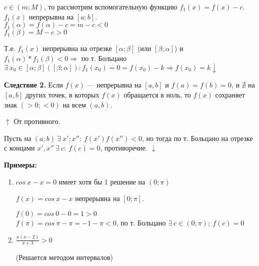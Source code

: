 \documentclass{article}
\begin{document}
    \( c \in (m; M) \), то рассмотрим вспомогательную функцию \( f_1(x) = f(x) - c \). \( f_1(x) \) непрерывна на \( [a; b] \).\\
    \( f_1(\alpha) = f(\alpha) - c = m - c < 0 \)\\
    \( f_1(\beta) = M - c > 0 \)

    Т.е. \(f_1(x)\) непрерывна на отрезке \( [\alpha; \beta] \) (или \( [\beta; \alpha] \)) и \( f_1(\alpha) * f_1(\beta) < 0 \Rightarrow \) по т. Больцано \( \exists\ x_0 \in [\alpha; \beta]([\beta; \alpha]): f_1(x_0) = 0 = f(x_0) - k \Rightarrow f(x_0) = k \downarrow \)

    \textbf{Следствие 2.} Если \( f(x) \) --- непрерывна на \( [a, b] \) и \( f(a) = f(b) = 0 \), и \(\nexists\) на \( [a, b] \) других точек, в которых \( f(x) \) обращается в ноль, то \( f(x) \) сохраняет знак \( (>0; <0) \) на всем \( (a, b) \).

    \(\uparrow\) От противного.

    Пусть на \((a; b)\ \exists\ x'; x'' :\ f(x')f(x'') < 0\), но тогда по т. Больцано на отрезке с концами \(x', x''\ \exists\ c:\ f(c)=0\), противоречие. \(\downarrow\)

    \textbf{Примеры:}

    \begin{enumerate}
        \item \(cos\ x - x = 0\) имеет хотя бы 1 решение на \((0; \pi)\)

        \(f(x) = cos\ x - x\) непрерывна на \([0; \pi]\).
    
        \(f(0) = cos\ 0 - 0 = 1 > 0\)\\
        \(f(\pi) = cos\ \pi - \pi = -1-\pi < 0\), по т. Больцано \(\exists\ c \in (0; \pi);\ f(c)=0\)

        \item \( \frac{x(x - 2)}{x + 3} > 0 \)

        (Решается методом интервалов)
    \end{enumerate}
    
\end{document}
